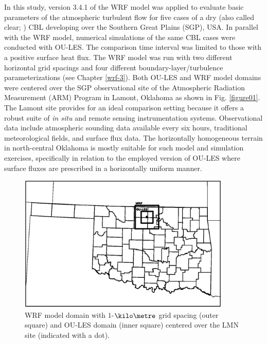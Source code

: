 In this study, version 3.4.1 of the WRF model was applied to evaluate basic parameters of the atmospheric turbulent flow for five cases of a dry (also called clear; \citealt{Holtslag1998}) CBL developing over the Southern Great Plains (SGP), USA. In parallel with the WRF model, numerical simulations of the same CBL cases were conducted with OU-LES. The comparison time interval was limited to those with a positive surface heat flux. The WRF model was run with two different horizontal grid spacings and four different boundary-layer\slash turbulence parameterizations (see Chapter \autoref{wrf-3}). Both OU-LES and WRF model domains were centered over the SGP observational site of the Atmospheric Radiation Measurement (ARM) Program in Lamont, Oklahoma as shown in Fig. \autoref{figure01}. The Lamont site provides for an ideal comparison setting because it offers a robust suite of \textit{in situ} and remote sensing instrumentation systems. Observational data include atmospheric sounding data available every six hours, traditional meteorological fields, and surface flux data. The horizontally homogeneous terrain in north-central Oklahoma is mostly suitable for such model and simulation exercises, specifically in relation to the employed version of OU-LES where surface fluxes are prescribed in a horizontally uniform manner.


\begin{figure}[H]
\begin{center}
\includegraphics[width=0.9\textwidth]{figures/chapter4/domains}
\end{center}
\caption{WRF model domain with $1$-$\kilo\metre$ grid spacing (outer square) and OU-LES domain (inner square) centered over the LMN site (indicated with a dot).}
\label{figure01}
\end{figure}


